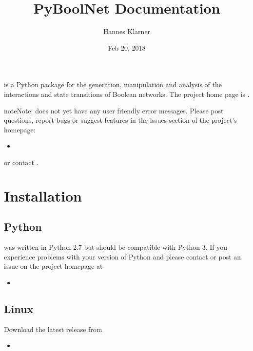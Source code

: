 \documentclass[letterpaper,10pt,english]{sphinxmanual}
\title{PyBoolNet Documentation}
\date{Feb 20, 2018}
\author{Hannes Klarner}
\begin{document}
\maketitle
\sphinxtableofcontents
{}\label{\detokenize{index::doc}}
 is a Python package for the generation, manipulation and analysis of the interactions and state transitions of Boolean networks.
The project home page is .

\begin{sphinxadmonition}{note}{Note:}
 does not yet have any user friendly error messages.
Please post questions, report bugs or suggest features in the issues section of the project’s homepage:
\begin{itemize}
\item {} 

\end{itemize}

or contact .
\end{sphinxadmonition}




\chapter{Installation}
\label{\detokenize{Installation:installation}}\label{\detokenize{Installation:id1}}\label{\detokenize{Installation::doc}}\label{\detokenize{Installation:installation-software}}

\section{Python}
\label{\detokenize{Installation:python}}
 was written in Python 2.7 but should be compatible with Python 3.
If you experience problems with your version of Python and  please contact  or
post an issue on the project homepage at
\begin{itemize}
\item {} 

\end{itemize}


\section{Linux}
\label{\detokenize{Installation:linux}}
Download the latest release from
\begin{itemize}
\item {} 

\end{itemize}
\end{document}
